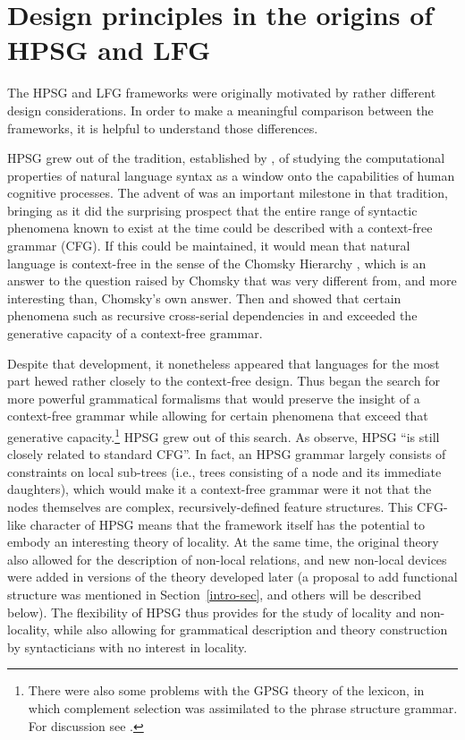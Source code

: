 \section{Design principles in the origins of HPSG and LFG} 
\label{design-sec}
The HPSG and LFG  frameworks were originally motivated by rather different design considerations.  In order to make a meaningful comparison between the frameworks, it is helpful to understand those differences.  

HPSG grew out of the tradition, established by \citet{Chomsky57a}, of studying the computational properties of natural language syntax as a window onto the capabilities of human cognitive processes.  The advent of  \citep{GKPS85a} was an important milestone in that tradition, bringing as it did the surprising prospect that the entire range of syntactic phenomena known to exist at the time could be described with a context-free grammar (CFG).  If this could be maintained, it would mean that natural language is context-free in the sense of the Chomsky Hierarchy \citep{Chomsky57a}, which is an answer to the question raised by Chomsky that was very different from, and more interesting than, Chomsky's own answer.  Then  \citet{Shieber85a} and \citet{Culy85a} showed that certain phenomena such as recursive cross-serial dependencies in  and  exceeded the generative capacity of a context-free grammar.   


Despite that development, it nonetheless appeared that languages for the most part hewed rather closely to the context-free design.  Thus began the search for more powerful grammatical formalisms that would preserve the insight of a context-free grammar while allowing for certain phenomena that exceed that generative capacity.\footnote{There were also some problems with the GPSG theory of the lexicon, in which complement selection was assimilated to the phrase structure grammar.  For discussion see \citet[Section~4.1]{MWArgSt}.}  HPSG grew out of this search. As  \citet[83]{SWB2003a} observe, HPSG ``is still  closely related to standard CFG''.  In fact, an HPSG grammar largely consists of constraints on local sub-trees (i.e., trees consisting of a node and its immediate daughters), which would make it a context-free grammar were it not that the nodes themselves are complex, recursively-defined feature structures.   This CFG-like character of HPSG means that the framework itself has the potential to embody an interesting theory of locality.   At the same time, the original theory also allowed for the description of non-local relations, and new non-local devices were added in versions of the theory developed later (a proposal to add functional structure was mentioned in Section~\ref{intro-sec}, and others will be described below).  The flexibility of HPSG thus provides for the study of locality and non-locality, while also allowing for grammatical description and theory construction by syntacticians with no interest in locality.  

